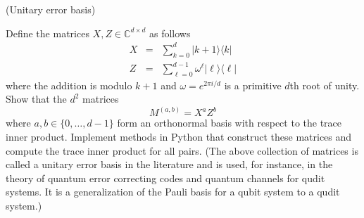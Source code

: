 \documentclass[12pt]{article}
\renewcommand{\>}{\rangle}
\newcommand{\<}{\langle}
\newcommand{\C}{\mathbb{C}}
\begin{document}
\newpage


 (Unitary error basis)

\noindent
Define the matrices $X,Z\in\C^{d\times d}$ as follows
\begin{eqnarray}
X & = & \sum_{k=0}^d |k+1\>\<k| \\
Z & = & \sum_{\ell=0}^{d-1} \omega^\ell |\ell\>\<\ell|
\end{eqnarray}
where the addition is modulo $k+1$ and $\omega=e^{2\pi i/d}$ is a primitive $d$th root of unity. Show that the $d^2$ matrices
\[
M^{(a,b)} = X^a Z^b
\]
where $a,b\in\{0,\ldots, d-1\}$ form an orthonormal basis with respect to the trace inner product. Implement methods in Python that construct these matrices and compute the trace inner product for all pairs. (The above collection of matrices is called a unitary error basis in the literature and is used, for instance, in the theory of quantum error correcting codes and quantum channels for qudit systems. It is a generalization of the Pauli basis for a qubit system to a qudit system.)
\end{document}
